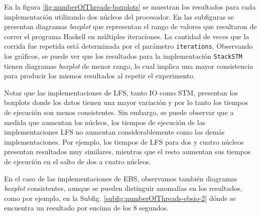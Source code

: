En la figura \ref{fig:numberOfThreads-boxplots} se muestran los resultados para cada implementación utilizando dos núcleos del procesador.
En las subfiguras se presentan diagramas \emph{boxplot} que representan el rango de valores que resultaron de correr el programa Haskell en múltiples iteraciones.
La cantidad de veces que la corrida fue repetida está determinada por el parámetro \texttt{iterations}. Observando los gráficos, se puede ver que los resultados para la implementación \texttt{StackSTM} tienen diagramas \emph{boxplot} de menor rango, lo cual implica una mayor consistencia para producir los mismos resultados al repetir el experimento.

Notar que las implementaciones de LFS, tanto IO como STM, presentan los boxplots donde los datos tienen una mayor variación y por lo tanto los tiempos de ejecución son menos consistentes. Sin embargo, se puede observar que a medida que aumentan los núcleos, los tiempos de ejecución de las implementaciones LFS no aumentan considerablemente como las demás implementaciones. Por ejemplo, los tiempos de LFS para dos y cuatro núcleos presentan resultados muy similares, mientras que el resto aumentan sus tiempos de ejecución en el salto de dos a cuatro núcleos.

En el caso de las implementaciones de EBS, observamos también diagramas \emph{boxplot} consistentes, aunque se pueden distinguir anomalías en los resultados, como por ejemplo, en la Subfig. \ref{subfig:numberOfThreads-ebsio-2} dónde se encuentra un resultado por encima de los 8 segundos.


